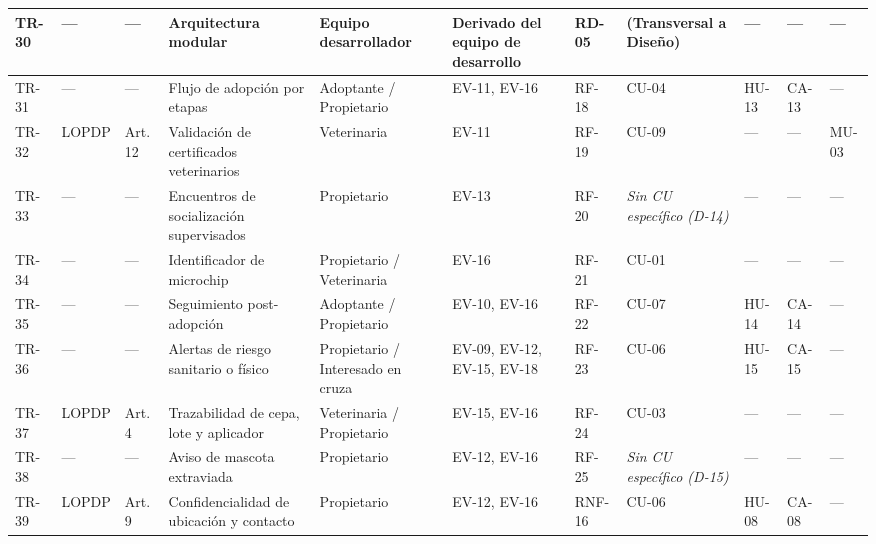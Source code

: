\documentclass[journal,onecolumn]{IEEEtran}
\begin{document}
\begin{landscape}
\begin{longtable}{@{}p{0.8cm} p{1.3cm} p{1.5cm} p{2.2cm} p{1.5cm} p{1.8cm} p{1.6cm} p{1.3cm} p{1.3cm} p{1.3cm} p{1.5cm}@{}}
			TR-30 & --- & --- & Arquitectura modular & Equipo desarrollador & Derivado del equipo de desarrollo & RD-05 & (Transversal a Diseño) & --- & --- & --- \\ \midrule
			
			TR-31 & --- & --- & Flujo de adopción por etapas & Adoptante / Propietario & EV-11, EV-16 & RF-18 & CU-04 & HU-13 & CA-13 & --- \\ \midrule
			
			TR-32 & LOPDP & Art. 12 & Validación de certificados veterinarios & Veterinaria & EV-11 & RF-19 & CU-09 & --- & --- & MU-03 \\ \midrule
			
			TR-33 & --- & --- & Encuentros de socialización supervisados & Propietario & EV-13 & RF-20 & \emph{Sin CU específico (D-14)} & --- & --- & --- \\ \midrule
			
			TR-34 & --- & --- & Identificador de microchip & Propietario / Veterinaria & EV-16 & RF-21 & CU-01 & --- & --- & --- \\ \midrule
			
			TR-35 & --- & --- & Seguimiento post-adopción & Adoptante / Propietario & EV-10, EV-16 & RF-22 & CU-07 & HU-14 & CA-14 & --- \\ \midrule
			
			TR-36 & --- & --- & Alertas de riesgo sanitario o físico & Propietario / Interesado en cruza & EV-09, EV-12, EV-15, EV-18 & RF-23 & CU-06 & HU-15 & CA-15 & --- \\ \midrule
			
			TR-37 & LOPDP & Art. 4 & Trazabilidad de cepa, lote y aplicador & Veterinaria / Propietario & EV-15, EV-16 & RF-24 & CU-03 & --- & --- & --- \\ \midrule
			
			TR-38 & --- & --- & Aviso de mascota extraviada & Propietario & EV-12, EV-16 & RF-25 & \emph{Sin CU específico (D-15)} & --- & --- & --- \\ \midrule
			
			TR-39 & LOPDP & Art. 9 & Confidencialidad de ubicación y contacto & Propietario & EV-12, EV-16 & RNF-16 & CU-06 & HU-08 & CA-08 & --- \\ \midrule
			

\end{longtable}
\end{landscape}
\end{document}
